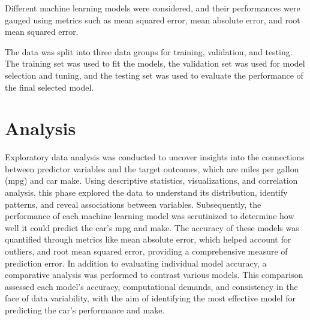 \documentclass[a4paper, twocolumn]{article}
\begin{document}
Different machine learning models were considered, and their performances were gauged using metrics such as mean squared error, mean absolute error, and root mean squared error.

The data was split into three data groups for training, validation, and testing. The training set was used to fit the models, the validation set was used for model selection and tuning, and the testing set was used to evaluate the performance of the final selected model.


\section{Analysis\label{sec:Analysis}}

Exploratory data analysis was conducted to uncover insights into the connections between predictor variables and the target outcomes, which are miles per gallon (mpg) and car make. Using descriptive statistics, visualizations, and correlation analysis, this phase explored the data to understand its distribution, identify patterns, and reveal associations between variables. Subsequently, the performance of each machine learning model was scrutinized to determine how well it could predict the car's mpg and make. The accuracy of these models was quantified through metrics like mean absolute error, which helped account for outliers, and root mean squared error, providing a comprehensive measure of prediction error. In addition to evaluating individual model accuracy, a comparative analysis was performed to contrast various models. This comparison assessed each model's accuracy, computational demands, and consistency in the face of data variability, with the aim of identifying the most effective model for predicting the car's performance and make.

\end{document}
